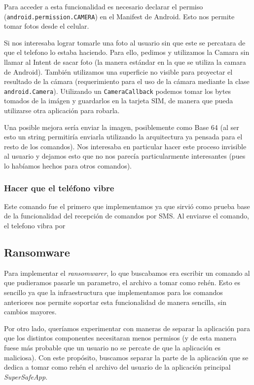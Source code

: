Para acceder a esta funcionalidad es necesario declarar el permiso
(\texttt{android.permission.CAMERA}) en el Manifest de Android. Esto nos permite
tomar fotos desde el celular.

Si nos interesaba lograr tomarle una foto al usuario sin que este se percatara
de que el telefono lo estaba haciendo. Para ello, pedimos y utilizamos la Camara
sin llamar al Intent de sacar foto (la manera estándar en la que se utiliza la
camara de Android). También utilizamos una superficie no visible para proyectar
el resultado de la cámara (requerimiento para el uso de la cámara mediante la
clase \texttt{android.Camera}). Utilizando un \texttt{CameraCallback} podemos 
tomar los bytes tomados de la imágen y guardarlos en la tarjeta SIM, de manera
que pueda utilizarse otra aplicación para robarla.

Una posible mejora sería enviar la imagen, posiblemente como Base 64 (al ser
esto un string permitiría enviarla utilizando la arquitectura ya pensada para
el resto de los comandos). Nos interesaba en particular hacer este proceso
invisible al usuario y dejamos esto que no nos parecía particularmente interesantes
(pues lo habíamos hechos para otros comandos).

\subsubsection{Hacer que el teléfono vibre}

Este comando fue el primero que implementamos ya que sirvió como prueba base de la 
funcionalidad del recepción de comandos por SMS. Al enviarse el comando, el telefono
vibra por 

\subsection{Ransomware}

Para implementar el \textit{ransomwarer}, lo que buscabamos era escribir un comando al que pudieramos pasarle un parametro, el archivo
a tomar como rehén. Esto es sencillo ya que la infraestructura que implementamos para los comandos anteriores nos permite soportar esta
funcionalidad de manera sencilla, sin cambios mayores.

Por otro lado, queríamos experimentar con maneras de separar la aplicación para que los distintos componentes necesitaran menos permisos
(y de esta manera fuese más probable que un usuario no se percate de que la aplicación es maliciosa). Con este propósito, buscamos separar
la parte de la aplicación que se dedica a tomar como rehén el archivo del usuario de la aplicación principal \textit{SuperSafeApp}.

